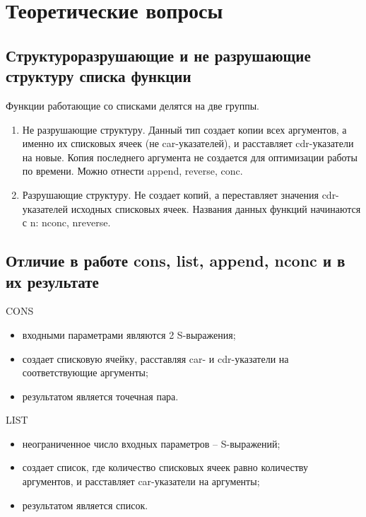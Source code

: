\documentclass[14pt,a4paper]{scrreprt}
\begin{document}


\thispagestyle{empty}

\chapter{Теоретические вопросы}

\section{Структуроразрушающие и не разрушающие структуру списка функции}

Функции работающие со списками делятся на две группы.
\begin{enumerate}
	\item Не разрушающие структуру. Данный тип создает копии всех аргументов, а именно их списковых ячеек (не car-указателей), и расставляет cdr-указатели на новые. Копия последнего аргумента не создается для оптимизации работы по времени. Можно отнести append, reverse, conc.
	\item Разрушающие структуру. Не создает копий, а переставляет значения cdr-указателей исходных списковых ячеек. Названия данных функций начинаются с n: nconc, nreverse.
\end{enumerate}

\section{Отличие в работе cons, list, append, nconc и в их результате}

CONS
\begin{itemize}
	\item входными параметрами являются 2 S-выражения;
	\item создает списковую ячейку, расставляя car- и cdr-указатели на соответствующие аргументы;
	\item результатом является точечная пара.
\end{itemize}

LIST
\begin{itemize}
	\item неограниченное число входных параметров -- S-выражений;
	\item создает список, где количество списковых ячеек равно количеству аргументов, и расставляет car-указатели на аргументы;
	\item результатом является список.
\end{itemize}
\end{document}
